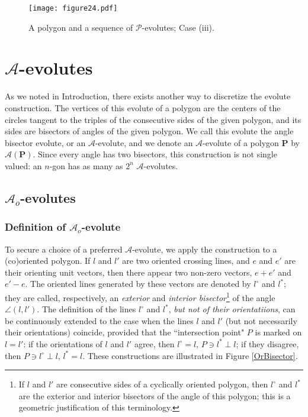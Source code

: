 \documentclass[12pt]{article}
\newcommand{\Pev}{\mathcal{P}}
\newcommand{\Aev}{\mathcal{A}}
\newcommand{\Aeo}{\mathcal{A}_o}
\renewcommand{\P}{\mathbf{P}}
\begin{document}
\begin{figure}[htbp]
\centering
\texttt{[image: figure24.pdf]}
\caption{A polygon and a sequence of $\Pev$-evolutes; Case (iii).}
\label{imaginary}
\end{figure}

\section{$\Aev$-evolutes}\label{A-evo}

As we noted in Introduction, there exists another way to discretize the evolute construction. The vertices of this evolute of a polygon are the centers of the circles tangent to the triples of the consecutive sides of the given polygon, and its sides are bisectors of angles of the given polygon. We call this evolute the angle bisector evolute, or an $\Aev$-evolute, and we denote an $\Aev$-evolute of a polygon $\P$ by $\Aev(\P)$. Since every angle has two bisectors, this construction is not single valued: an $n$-gon has as many as $2^n$ $\Aev$-evolutes.

\subsection{$\Aev_o$-evolutes}\label{Ao-evo}

\subsubsection{Definition of  $\Aeo$-evolute}\label{defAo}

To secure a choice of a preferred $\Aev$-evolute, we apply the construction to a (co)oriented polygon. If $l$ and $l'$ are two oriented crossing lines, and $e$ and $e'$ are their orienting unit vectors, then there appear two non-zero vectors, $e+e'$ and $e'-e$. The oriented lines generated by these vectors are denoted by $l^\circ$ and $l^\ast$; they are called, respectively, an {\it exterior} and {\it interior bisector}\footnote{If $l$ and $l'$ are consecutive sides of a cyclically oriented polygon, then $l^\circ$ and $l^\ast$ are the exterior and interior bisectors of the angle of this polygon; this is a geometric justification of this terminology.} of the angle $\angle(l,l')$. The definition of the lines $l^\circ$ and $l^\ast$, {\it but not of their orientatiions}, can be continuously extended to the case when the lines $l$ and $l'$ (but not necessarily their orientations) coincide, provided that the ``intersection point" $P$ is marked on $l=l'$: if the orientations of $l$ and $l'$ agree, then $l^\circ=l,\, P\ni l^\ast\perp l$; if they disagree, then $P\ni l^\circ\perp l,\, l^\ast=l$. These constructions are illustrated in Figure \ref{OrBisector}.
\end{document}
